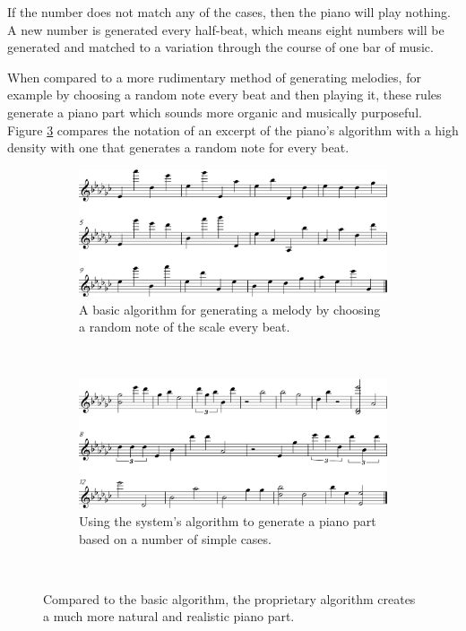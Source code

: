 If the number does not match any of the cases, then the piano will play nothing. A new number is generated every half-beat, which means eight numbers will be generated and matched to a variation through the course of one bar of music.

When compared to a more rudimentary method of generating melodies, for example by choosing a random note every beat and then playing it, these rules generate a piano part which sounds more organic and musically purposeful. Figure \ref{fig:piano} compares the notation of an excerpt of the piano’s algorithm with a high density with one that generates a random note for every beat.

\begin{figure}[htb] 
    \centering
    \begin{subfigure}[b]{0.45\textwidth}
        \includegraphics[width=\textwidth]{images/implementation/generated-piano-basic.png}
        \caption{A basic algorithm for generating a melody by choosing a random note of the scale every beat.}
        \label{fig:generated-piano-basic}
    \end{subfigure}
    ~
    \begin{subfigure}[b]{0.45\textwidth}
        \includegraphics[width=\textwidth]{images/implementation/generated-piano.png}
        \caption{Using the system's algorithm to generate a piano part based on a number of simple cases.}
        \label{fig:generated-piano}
    \end{subfigure}
    ~
    \caption{
    Compared to the  basic algorithm, the  proprietary algorithm creates a much more natural and realistic piano part.
    }\label{fig:piano}
\end{figure}

